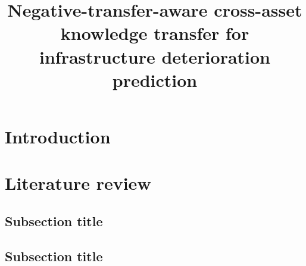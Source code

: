 \documentclass[authoryear,preprint,review,times,10pt]{elsarticle}
\begin{document}
\modulolinenumbers[1]
\runninglinenumbers
\begin{frontmatter}

\title{Negative-transfer-aware cross-asset knowledge transfer for infrastructure deterioration prediction}

%
%
%
%

\begin{abstract}
\end{abstract}

\begin{keyword}
\end{keyword}

\end{frontmatter}


\section{Introduction}

\section{Literature review}
\subsection{Subsection title}

\subsection{Subsection title}
\end{document}
